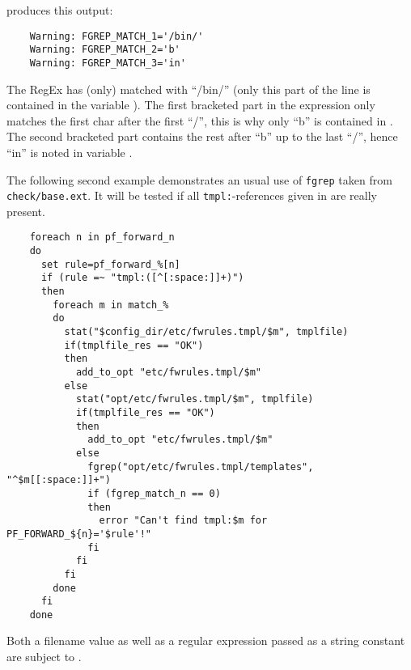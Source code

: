     produces this output:

\begin{example}
\begin{verbatim}
    Warning: FGREP_MATCH_1='/bin/'
    Warning: FGREP_MATCH_2='b'
    Warning: FGREP_MATCH_3='in'
\end{verbatim}
\end{example}

    The RegEx has (only) matched with ``/bin/'' (only this part of the
    line is contained in the variable ). The first bracketed
    part in the expression only matches the first char after the first ``/'',
    this is why only ``b'' is contained in . The second
    bracketed part contains the rest after ``b'' up to the last ``/'',
    hence ``in'' is noted in variable .

    The following second example demonstrates an usual use of \texttt{fgrep}
    taken from \texttt{check/base.ext}. It will be tested if all \texttt{tmpl:}-references
    given in  are really present.

\begin{example}
\begin{verbatim}
    foreach n in pf_forward_n
    do
      set rule=pf_forward_%[n]
      if (rule =~ "tmpl:([^[:space:]]+)")
      then
        foreach m in match_%
        do
          stat("$config_dir/etc/fwrules.tmpl/$m", tmplfile)
          if(tmplfile_res == "OK")
          then
            add_to_opt "etc/fwrules.tmpl/$m"
          else
            stat("opt/etc/fwrules.tmpl/$m", tmplfile)
            if(tmplfile_res == "OK")
            then
              add_to_opt "etc/fwrules.tmpl/$m"
            else
              fgrep("opt/etc/fwrules.tmpl/templates", "^$m[[:space:]]+")
              if (fgrep_match_n == 0)
              then
                error "Can't find tmpl:$m for PF_FORWARD_${n}='$rule'!"
              fi
            fi
          fi
        done
      fi
    done
\end{verbatim}
\end{example}

    Both a filename value as well as a regular expression passed as a string constant are subject to
    .


